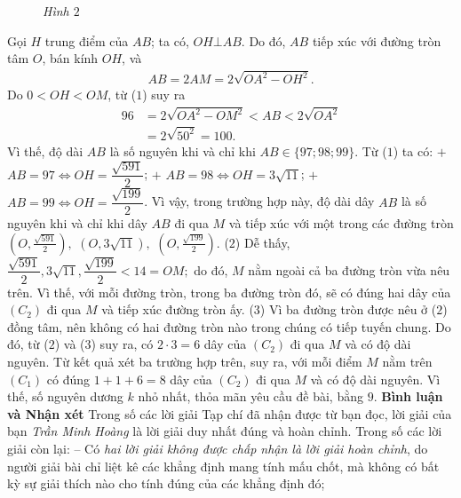 \begin{multicols}{2}
\begin{figure}[H]
		\caption{\small\textit{\color{thachthuctoanhoc}Hình $2$}}
		\vspace*{-10pt}
	\end{figure}
	Gọi $H$ trung điểm của $AB$; ta có, $OH \bot AB$. Do đó, $AB$ tiếp xúc với đường tròn tâm $O$, bán kính $OH$, và
	\begin{align*}
		AB = 2AM = 2\sqrt {O{A^2} - O{H^2}}. \tag{$1$}
	\end{align*}
	Do $0 < OH < OM$, từ ($1$) suy ra
	\begin{align*}
		96 &= 2\sqrt {O{A^2} - O{M^2}}  < AB < 2\sqrt {O{A^2}}  \\
		&= 2\sqrt {{{50}^2}}  = 100.
	\end{align*}
	Vì thế, độ dài $AB$ là số nguyên khi và chỉ khi $AB \in \{97; 98; 99\}$.
	\vskip 0.05cm
	Từ ($1$) ta có:
	\vskip 0.05cm
	$+$ $AB = 97  \Leftrightarrow  OH = \dfrac{{\sqrt {591} }}{2}$;
	\vskip 0.05cm
	$+$ $AB = 98  \Leftrightarrow OH = 3\sqrt{11}$;
	\vskip 0.05cm
	$+$ $AB = 99  \Leftrightarrow  OH = \dfrac{{\sqrt {199} }}{2}$.
	\vskip 0.05cm
	Vì vậy, trong trường hợp này, độ dài dây $AB$ là số nguyên khi và chỉ khi dây $AB$ đi qua $M$ và tiếp xúc với một trong các đường tròn $\left( {O,\frac{{\sqrt {591} }}{2}} \right),$    $\left( {O,3\sqrt {11} } \right),$      $\left( {O,\frac{{\sqrt {199} }}{2}}\right)$. \hfill ($2$)
	\vskip 0.05cm
	Dễ thấy, $\dfrac{{\sqrt {591} }}{2},3\sqrt {11} ,\dfrac{{\sqrt {199} }}{2} < 14 = OM;$  do đó, $M$ nằm ngoài cả ba đường tròn vừa nêu trên. Vì thế, với mỗi đường tròn, trong ba đường tròn đó, sẽ có đúng hai dây của  $(C_2)$ đi qua $M$ và tiếp xúc đường tròn ấy.                  \hfill ($3$)
	\vskip 0.05cm
	Vì ba đường tròn được nêu ở ($2$) đồng tâm, nên không có hai đường tròn nào trong chúng có tiếp tuyến chung. Do đó, từ ($2$) và ($3$) suy ra, có $2 \cdot 3 = 6$  dây của  $(C_2)$ đi qua $M$ và có độ dài nguyên.
	\vskip 0.05cm
	Từ kết quả xét ba trường hợp trên, suy ra, với mỗi điểm $M$ nằm trên $(C_1)$  có đúng $1 + 1 + 6 = 8$ dây của $(C_2)$  đi qua $M$ và có độ dài nguyên. Vì thế, số nguyên dương $k$ nhỏ nhất, thỏa mãn yêu cầu đề bài, bằng $9$.
	\vskip 0.05cm
	\textbf{\color{thachthuctoanhoc}Bình luận và Nhận xét}
	\vskip 0.05cm
	Trong số các lời giải Tạp chí đã nhận được từ bạn đọc, lời giải của bạn \textit{Trần Minh Hoàng} là lời giải duy nhất đúng và hoàn chỉnh. Trong số các lời giải còn lại:
	\vskip 0.05cm
	-- Có \textit{hai lời giải không được chấp nhận là lời giải hoàn chỉnh}, do người giải bài chỉ liệt kê các khẳng định mang tính mấu chốt, mà không có bất kỳ sự giải thích nào cho tính đúng của các khẳng định đó;

\end{multicols}
